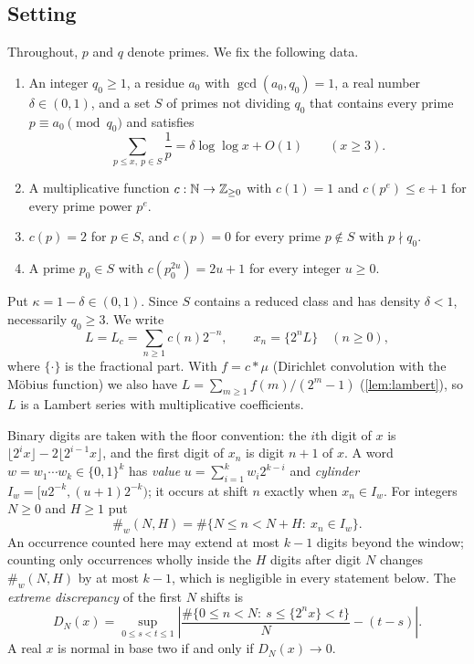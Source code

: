 \documentclass[11pt]{article}
\newcommand{\cnt}{\#}
\begin{document}
\subsection{Setting}\label{subsec:setting}

Throughout, $p$ and $q$ denote primes. We fix the following data.

\begin{enumerate}[label=\textup{(H\arabic*)},leftmargin=3.2em]
\item\label{H1} An integer $q_0\ge1$, a residue $a_0$ with $\gcd(a_0,q_0)=1$, a real
  number $\delta\in(0,1)$, and a set $S$ of primes not dividing $q_0$ that
  contains every prime $p\equiv a_0\pmod{q_0}$ and satisfies
  \begin{equation}\label{eq:harmonic}
  \sum_{p\le x,\ p\in S}\frac1p=\delta\log\log x+O(1)\qquad(x\ge3).
  \end{equation}
\item\label{H2} A multiplicative function $c:\mathbb N\to\mathbb Z_{\ge0}$ with $c(1)=1$ and
  $c(p^e)\le e+1$ for every prime power $p^e$.
\item\label{H3} $c(p)=2$ for $p\in S$, and $c(p)=0$ for every prime $p\notin S$ with
  $p\nmid q_0$.
\item\label{H4} A prime $p_0\in S$ with $c(p_0^{2u})=2u+1$ for every integer $u\ge0$.
\end{enumerate}

Put $\kappa=1-\delta\in(0,1)$. Since $S$ contains a reduced class and has
density $\delta<1$, necessarily $q_0\ge3$. We write
\[
L=L_c=\sum_{n\ge1}c(n)2^{-n},\qquad x_n=\{2^nL\}\quad(n\ge0),
\]
where $\{\cdot\}$ is the fractional part. With $f=c*\mu$ (Dirichlet convolution
with the M\"obius function) we also have
$L=\sum_{m\ge1}f(m)/(2^m-1)$ (\cref{lem:lambert}), so $L$ is a Lambert series
with multiplicative coefficients.

Binary digits are taken with the floor convention: the $i$th digit of $x$ is
$\lfloor 2^ix\rfloor-2\lfloor2^{i-1}x\rfloor$, and the first digit of $x_n$ is
digit $n+1$ of $x$. A word $w=w_1\cdots w_k\in\{0,1\}^k$ has \emph{value}
$u=\sum_{i=1}^k w_i2^{k-i}$ and \emph{cylinder}
$I_w=[u2^{-k},(u+1)2^{-k})$; it occurs at shift $n$ exactly when $x_n\in I_w$.
For integers $N\ge0$ and $H\ge1$ put
\[
\cnt_w(N,H)=\#\{N\le n<N+H:\ x_n\in I_w\}.
\]
An occurrence counted here may extend at most $k-1$ digits beyond the window;
counting only occurrences wholly inside the $H$ digits after digit $N$ changes
$\cnt_w(N,H)$ by at most $k-1$, which is negligible in every statement below.
The \emph{extreme discrepancy} of the first $N$ shifts is
\[
D_N(x)=\sup_{0\le s<t\le1}\left|\frac{\#\{0\le n<N:\ s\le\{2^nx\}<t\}}{N}-(t-s)\right| .
\]
A real $x$ is normal in base two if and only if $D_N(x)\to0$.
\end{document}
